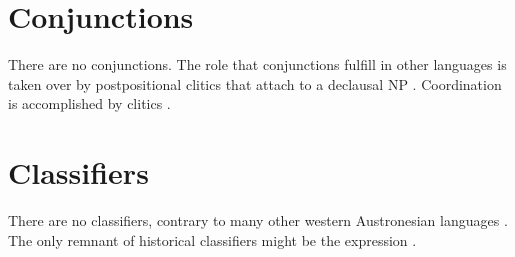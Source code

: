 \section{Conjunctions}\label{sec:wc:Conjunctions}
There are no conjunctions. The role that conjunctions fulfill in other languages is taken over by postpositional clitics that attach to a declausal NP . Coordination is accomplished by clitics .

\section{Classifiers}\label{sec:wc:Classifiers}
There are no classifiers, contrary to many other western Austronesian languages \citep[173]{Himmelmann2005typochar}. The only remnant of historical classifiers might be the expression .
